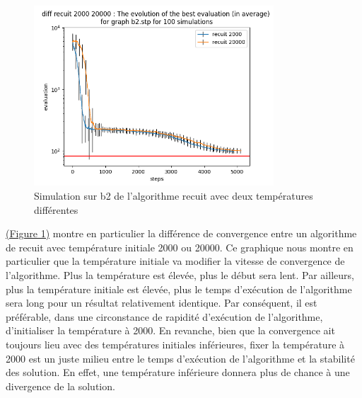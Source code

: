 \documentclass[11pt,french]{report}
\begin{document}
        \begin{figure}
        	\begin{center}
        		\includegraphics[width=0.8\textwidth]{best_b2_evaluation_diff recuit 2000 20000.png}
        	\end{center}
        	\caption{Simulation sur b2 de l'algorithme recuit avec deux températures différentes}
        	\label{Figure1}
        \end{figure}
        
        \hyperref[Figure1]{(Figure 1)} montre en particulier la différence de convergence entre un algorithme de recuit avec température initiale 2000 ou 20000. Ce graphique nous montre en particulier que la température initiale va modifier la vitesse de convergence de l'algorithme. Plus la température est élevée, plus le début sera lent. Par ailleurs, plus la température initiale est élevée, plus le temps d'exécution de l'algorithme sera long pour un résultat relativement identique.
        Par conséquent, il est préférable, dans une circonstance de rapidité d'exécution de l'algorithme, d'initialiser la température à 2000.
        En revanche, bien que la convergence ait toujours lieu avec des températures initiales inférieures, fixer la température à 2000 est un juste milieu entre le temps d'exécution de l'algorithme et la stabilité des solution. En effet, une température inférieure donnera plus de chance à une divergence de la solution.\\
        
\end{document}
